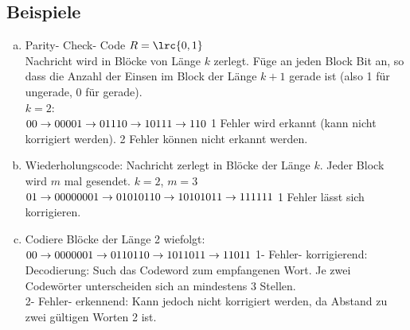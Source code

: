  \subsection{Beispiele}
    \begin{enumerate}[a)]
      \item Parity- Check- Code
        $R=\lrc{0,1}$\\
        Nachricht wird in Blöcke von Länge $k$ zerlegt. Füge an jeden Block Bit
        an, so dass die Anzahl der Einsen im Block der Länge $k+1$ gerade ist
        (also 1 für ungerade, 0 für gerade).\\
        $k=2$:\\
        $00\rightarrow000\\
        01\rightarrow011\\
        10\rightarrow101\\
        11\rightarrow110\\$
        1 Fehler wird erkannt (kann nicht korrigiert werden). 2 Fehler können
        nicht erkannt werden.
      \item Wiederholungscode: Nachricht zerlegt in Blöcke der Länge $k$. Jeder
        Block wird $m$ mal gesendet. $k=2$, $m=3$\\
        $01\rightarrow000000\\
        01\rightarrow010101\\
        10\rightarrow101010\\
        11\rightarrow111111\\$
        1 Fehler lässt sich korrigieren.
      \item Codiere Blöcke der Länge 2 wiefolgt:\\
        $00\rightarrow00000\\
        01\rightarrow01101\\
        10\rightarrow10110\\
        11\rightarrow11011\\$
        1- Fehler- korrigierend:\\
        Decodierung: Such das  Codeword zum empfangenen Wort. Je
        zwei Codewörter unterscheiden sich an mindestens 3 Stellen.\\
        2- Fehler- erkennend: Kann jedoch nicht korrigiert werden, da Abstand
        zu zwei gültigen Worten 2 ist.
    \end{enumerate}
